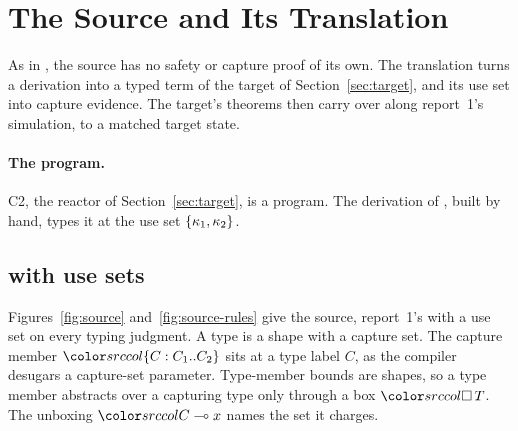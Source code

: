 \FloatBarrier
\section{The Source and Its Translation}\label{sec:source}
\suppressfloats[t]

\providecommand{\varatom}[1]{\mathit{varAtom}(#1)}
\providecommand{\capwit}{\mathit{capwit}}
\providecommand{\tstate}{\tgt{\mathit{stt}}}
\providecommand{\expd}[1]{\mathit{expand}_{#1}\,}

\mathsrc

As in \Rone, the source has no safety or capture proof of its own. The translation turns a derivation into a typed term of the target of Section~\ref{sec:target}, and its use set into capture evidence. The target's theorems then carry over along report~1's simulation, to a matched target state.

\paragraph{The program.}
C2, the reactor of Section~\ref{sec:target}, is a \DOTMNF program. The derivation  of \treeK, built by hand, types it at the use set $\{\kappa_1, \kappa_2\}$.

\subsection{\DOTMNF with use sets}\label{sec:source-calc}

Figures~\ref{fig:source} and~\ref{fig:source-rules} give the source, report~1's \DOTMNF with a use set on every typing judgment. A type is a shape with a capture set. The capture member $\dcap{C}{C_1}{C_2}$ sits at a type label $C$, as the compiler desugars a capture-set parameter. Type-member bounds are shapes, so a type member abstracts over a capturing type only through a box $\dbox{T}$. The unboxing $\dunbox{C}{x}$ names the set it charges.

